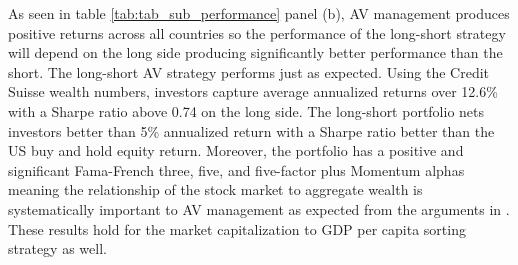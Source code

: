 As seen in table \ref{tab:tab_sub_performance} panel (b), AV management produces positive returns across all countries so the performance of the long-short strategy will depend on the long side producing significantly better performance than the short. The long-short AV strategy performs just as expected. Using the Credit Suisse wealth numbers, investors capture average annualized returns over 12.6\% with a Sharpe ratio above 0.74 on the long side. %
The long-short portfolio nets investors better than 5\% annualized return with a Sharpe ratio better than the US buy and hold equity return. Moreover, the portfolio has a positive and significant Fama-French three, five, and five-factor plus Momentum alphas meaning the relationship of the stock market to aggregate wealth is systematically important to AV management as expected from the arguments in \citet{pollet_average_2010}. These results hold for the market capitalization to GDP per capita sorting strategy as well.

